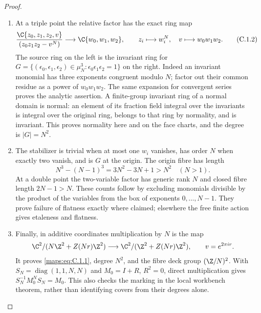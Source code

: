 \begin{proof}
\begin{enumerate}[label=\arabic*.,leftmargin=*]
\item At a triple point the relative factor has the exact ring map
\[
 \frac{\C\{z_0,z_1,z_2,v\}}{(z_0z_1z_2-v^N)}
 \longrightarrow\C\{w_0,w_1,w_2\},\qquad
 z_i\longmapsto w_i^N,\quad v\longmapsto w_0w_1w_2.
 \tag{C.1.2}\label{maps:eq:C.1.2}
\]
The source ring on the left is the invariant ring for
$G=\{(\epsilon_0,\epsilon_1,\epsilon_2)\in\mu_N^3:
\epsilon_0\epsilon_1\epsilon_2=1\}$ on the right. Indeed an invariant
monomial has three exponents congruent modulo $N$; factor out their
common residue as a power of $w_0w_1w_2$. The same expansion for convergent
series proves the analytic assertion. A finite-group invariant ring of a
normal domain is normal: an element of its fraction field integral over
the invariants is integral over the original ring, belongs to that ring
by normality, and is invariant. This proves normality here and on the
face charts, and the degree is $|G|=N^2$.

\item The stabilizer is trivial when at most one $w_i$ vanishes, has order $N$
when exactly two vanish, and is $G$ at the origin. The origin fibre has
length
\[
 N^3-(N-1)^3=3N^2-3N+1>N^2\quad(N>1).
\]
At a double point the two-variable factor has generic rank $N$ and
closed fibre length $2N-1>N$. These counts follow by excluding monomials
divisible by the product of the variables from the box of exponents
$0,\ldots,N-1$. They prove failure of flatness exactly where claimed;
elsewhere the free finite action gives etaleness and flatness.

\item Finally, in additive coordinates multiplication by $N$ is the map
\[
 \C^2/(N\Z^2+Z(Nr)\Z^2)\longrightarrow
 \C^2/(\Z^2+Z(Nr)\Z^2),\qquad v=e^{2\pi ir}.
\]
It proves \eqref{maps:eq:C.1.1}, degree $N^2$, and the fibre deck group
$(\Z/N)^2$. With $S_N=\operatorname{diag}(1,1,N,N)$ and
$M_0=I+R$, $R^2=0$, direct multiplication gives
$S_N^{-1}M_0^NS_N=M_0$. This also checks the marking in the local
workbench theorem, rather than identifying covers from their degrees
alone.
\end{enumerate}
\end{proof}

